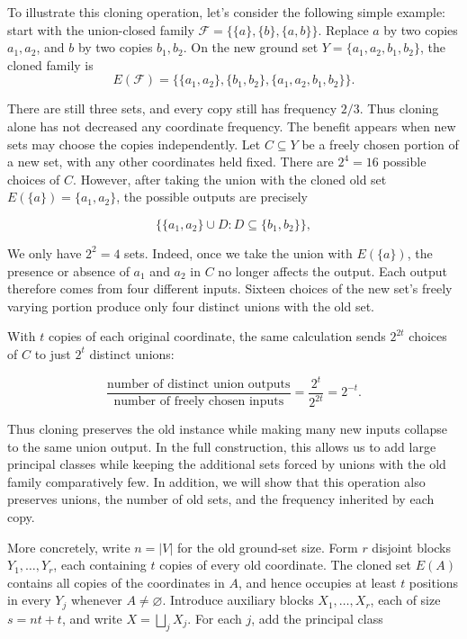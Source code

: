 \documentclass[11pt]{article}
\newcommand{\<}{\langle}
\renewcommand{\>}{\rangle}
\newcommand{\calF}{\mathcal{F}}
\numberwithin{equation}{section}
\begin{document}
To illustrate this cloning operation, let's consider the following simple example: start with the union-closed family $\calF=\bigl\{\{a\},\{b\},\{a,b\}\bigr\}.$ Replace \(a\) by two copies \(a_1,a_2\), and \(b\) by two copies \(b_1,b_2\). On the new ground set $Y = \{a_1,a_2,b_1,b_2\}$, the cloned family is
\[
E(\mathcal F) = \bigl\{ \{a_1,a_2\}, \{b_1,b_2\}, \{a_1,a_2,b_1,b_2\} \bigr\}.
\]

There are still three sets, and every copy still has frequency \(2/3\). Thus cloning alone has not decreased any coordinate frequency. The benefit appears when new sets may choose the copies independently. Let \(C\subseteq Y\) be a freely chosen portion of a new set, with any other coordinates held fixed. There are \(2^4=16\) possible choices of \(C\). However, after taking the union with the cloned old set $E(\{a\})=\{a_1,a_2\}$,
the possible outputs are precisely

$$ \bigl\{ \{a_1,a_2\}\cup D: D\subseteq\{b_1,b_2\} \bigr\}, $$

 We only have \(2^2=4\) sets. Indeed, once we take the union with \(E(\{a\})\), the presence or absence of \(a_1\) and \(a_2\) in \(C\) no longer affects the output. Each output therefore comes from four different inputs. Sixteen choices of the new set’s freely varying portion produce only four distinct unions with the old set.

With \(t\) copies of each original coordinate, the same calculation sends \(2^{2t}\) choices of \(C\) to just \(2^t\) distinct unions:

$$ \frac{\text{number of distinct union outputs}} {\text{number of freely chosen inputs}} = \frac{2^t}{2^{2t}} = 2^{-t}. $$

Thus cloning preserves the old instance while making many new inputs collapse to the same union output. In the full construction, this allows us to add large principal classes while keeping the additional sets forced by unions with the old family comparatively few.
In addition, we will show that this operation also preserves unions, the number of old sets, and the frequency inherited by each copy. 

More concretely, write \(n=|V|\) for the old ground-set size. Form \(r\) disjoint blocks \(Y_1,\ldots,Y_r\), each containing \(t\) copies of every old coordinate. The cloned set \(E(A)\) contains all copies of the coordinates in \(A\), and hence occupies at least \(t\) positions in every \(Y_j\) whenever \(A\ne\varnothing\). Introduce auxiliary blocks \(X_1,\ldots,X_r\), each of size \(s=nt+t\), and write \(X=\bigsqcup_jX_j\). For each \(j\), add the principal class
\end{document}
